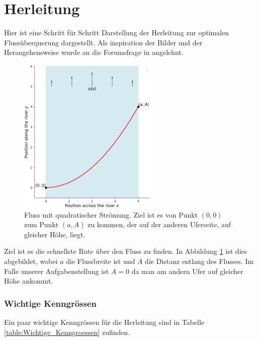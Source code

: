 %
%
%
%
\section{Herleitung
\label{schwimmen:section:naiver_weg}}

Hier ist eine Schritt für Schritt Darstellung der Herleitung zur optimalen Flussüberquerung dargestellt. Als inspiration der Bilder und der Herangehensweise wurde an die Forumsfrage in \cite{schwimmen:mathForum} angelehnt. 

\begin{figure}
    \centering
        \centering
        \includegraphics[width=0.6\textwidth]{papers/schwimmen/Grafiken/Figure_1-crop.png}	
        \caption{Fluss mit quadratischer Strömung. Ziel ist es von Punkt \((0,0)\) zum Punkt \((a,A)\) zu kommen, der auf der anderen Uferseite, auf gleicher Höhe, liegt.}
        \label{fig:river_template}
\end{figure}

Ziel ist es die schnellste Rute über den Fluss zu finden. In Abbildung \ref{fig:river_template} ist dies abgebildet, wobei \(a\) die Flussbreite ist und \(A\) die Distanz entlang des Flusses. Im Falle unserer Aufgabenstellung ist \(A=0\) da man am andern Ufer auf gleicher Höhe ankommt.

\subsubsection{Wichtige Kenngrössen}
Ein paar wichtige Kenngrössen für die Herleitung sind in Tabelle \ref{table:Wichtige_Kenngroessen} zufinden.

